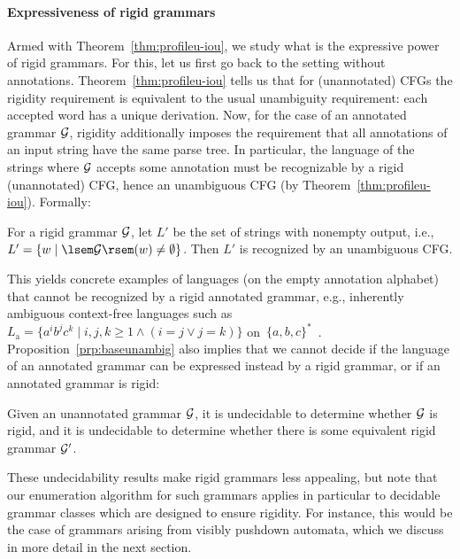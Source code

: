 \paragraph{Expressiveness of rigid grammars}
Armed with Theorem~\ref{thm:profileu-iou}, we study what is the expressive power
of rigid grammars. For this, let us first go back to the setting without
annotations. Theorem~\ref{thm:profileu-iou} tells us that for (unannotated) CFGs the rigidity
requirement is equivalent to the usual unambiguity requirement: each accepted
word has a unique derivation.
Now, for the case of an annotated grammar $\mathcal{G}$,
rigidity additionally imposes the requirement
that all annotations of an input string have the same parse tree.
In particular, the language of the strings where $\mathcal{G}$ accepts some
annotation must be recognizable by a rigid (unannotated) CFG, hence an unambiguous CFG (by
Theorem~\ref{thm:profileu-iou}). Formally:

\begin{proposition}
  \label{prp:baseunambig}
   For a rigid grammar $\mathcal{G}$, let $L'$ be the set of strings with nonempty output, i.e., $L' = \{w \mid \sem{\cG}(w) \not = \emptyset\} $. Then $L'$ is
  recognized by an unambiguous CFG.
\end{proposition}

This yields concrete examples of languages (on the empty annotation alphabet) that cannot be recognized by a
rigid annotated grammar, e.g., inherently ambiguous context-free languages
such as $L_\mathrm{a} = \{a^i b^j c^k \mid i, j, k \geq 1 \land (i = j \lor j =
k)\}$ on~$\{a, b, c\}^*$~\cite{maurer1969direct}.
%
%
%
%
Proposition~\ref{prp:baseunambig} also implies that we cannot decide if the language
of an annotated grammar can be expressed instead by a rigid grammar,
or if an annotated grammar is rigid:

\begin{proposition}
  \label{prp:unambundec2}
  Given an unannotated grammar $\mathcal{G}$, it is undecidable to determine whether $\mathcal{G}$
  is rigid, and it is undecidable to determine whether there
  is some equivalent rigid grammar $\mathcal{G}'$.
\end{proposition}

These undecidability results make 
rigid grammars less appealing, but note that our enumeration algorithm for such
grammars applies in particular to decidable grammar classes which are
designed to ensure rigidity. For instance, this would be the case
of grammars arising from visibly pushdown automata, which we discuss in more
detail in the next section.

